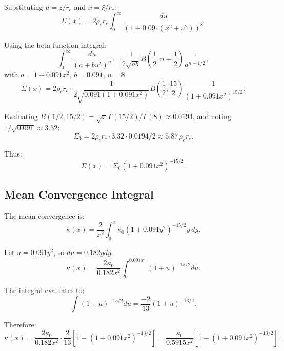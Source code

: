 \documentclass[11pt,a4paper]{article}
\theoremstyle{definition}
\theoremstyle{remark}
\begin{document}
Substituting $u = z/r_c$ and $x = \xi/r_c$:
\begin{equation}
\Sigma(x) = 2\rho_c r_c \int_0^\infty \frac{du}{\left(1 + 0.091(x^2 + u^2)\right)^8}.
\end{equation}

Using the beta function integral:
\begin{equation}
\int_0^\infty \frac{du}{(a + bu^2)^n} = \frac{1}{2\sqrt{ab}} B\left(\frac{1}{2}, n - \frac{1}{2}\right) \frac{1}{a^{n-1/2}},
\end{equation}
with $a = 1 + 0.091 x^2$, $b = 0.091$, $n = 8$:
\begin{equation}
\Sigma(x) = 2\rho_c r_c \cdot \frac{1}{2\sqrt{0.091(1 + 0.091 x^2)}} B\left(\frac{1}{2}, \frac{15}{2}\right) \frac{1}{(1 + 0.091 x^2)^{15/2}}.
\end{equation}

Evaluating $B(1/2, 15/2) = \sqrt{\pi} \Gamma(15/2)/\Gamma(8) \approx 0.0194$, and noting $1/\sqrt{0.091} \approx 3.32$:
\begin{equation}
\Sigma_0 = 2\rho_c r_c \cdot 3.32 \cdot 0.0194 / 2 \approx 5.87 \, \rho_c r_c.
\end{equation}

Thus:
\begin{equation}
\Sigma(x) = \Sigma_0 (1 + 0.091 x^2)^{-15/2}.
\end{equation}

\subsection{Mean Convergence Integral}

The mean convergence is:
\begin{equation}
\bar{\kappa}(x) = \frac{2}{x^2} \int_0^x \kappa_0 (1 + 0.091 y^2)^{-15/2} y \, dy.
\end{equation}

Let $u = 0.091 y^2$, so $du = 0.182 y dy$:
\begin{equation}
\bar{\kappa}(x) = \frac{2\kappa_0}{0.182 x^2} \int_0^{0.091 x^2} (1 + u)^{-15/2} du.
\end{equation}

The integral evaluates to:
\begin{equation}
\int (1 + u)^{-15/2} du = \frac{-2}{13}(1 + u)^{-13/2}.
\end{equation}

Therefore:
\begin{equation}
\bar{\kappa}(x) = \frac{2\kappa_0}{0.182 x^2} \cdot \frac{2}{13} \left[1 - (1 + 0.091 x^2)^{-13/2}\right] = \frac{\kappa_0}{0.5915 x^2}\left[1 - (1 + 0.091 x^2)^{-13/2}\right].
\end{equation}
\end{document}
